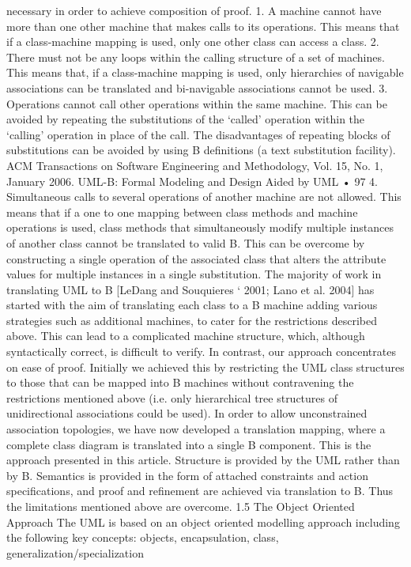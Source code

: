 necessary in order to achieve composition of proof.
1. A machine cannot have more than one other machine that makes calls to
its operations. This means that if a class-machine mapping is used, only one
other class can access a class.
2. There must not be any loops within the calling structure of a set of machines.
This means that, if a class-machine mapping is used, only hierarchies of navigable associations can be translated and bi-navigable associations cannot
be used.
3. Operations cannot call other operations within the same machine. This can
be avoided by repeating the substitutions of the ‘called’ operation within the
‘calling’ operation in place of the call. The disadvantages of repeating blocks
of substitutions can be avoided by using B definitions (a text substitution
facility).
ACM Transactions on Software Engineering and Methodology, Vol. 15, No. 1, January 2006.
UML-B: Formal Modeling and Design Aided by UML • 97
4. Simultaneous calls to several operations of another machine are not allowed.
This means that if a one to one mapping between class methods and machine
operations is used, class methods that simultaneously modify multiple instances of another class cannot be translated to valid B. This can be overcome by constructing a single operation of the associated class that alters
the attribute values for multiple instances in a single substitution.
The majority of work in translating UML to B [LeDang and Souquieres `
2001; Lano et al. 2004] has started with the aim of translating each class to a B
machine adding various strategies such as additional machines, to cater for the
restrictions described above. This can lead to a complicated machine structure,
which, although syntactically correct, is difficult to verify. In contrast, our
approach concentrates on ease of proof. Initially we achieved this by restricting
the UML class structures to those that can be mapped into B machines
without contravening the restrictions mentioned above (i.e. only hierarchical
tree structures of unidirectional associations could be used). In order to allow
unconstrained association topologies, we have now developed a translation
mapping, where a complete class diagram is translated into a single B component. This is the approach presented in this article. Structure is provided
by the UML rather than by B. Semantics is provided in the form of attached
constraints and action specifications, and proof and refinement are achieved
via translation to B. Thus the limitations mentioned above are overcome.
1.5 The Object Oriented Approach
The UML is based on an object oriented modelling approach including the following key concepts: objects, encapsulation, class, generalization/specialization
